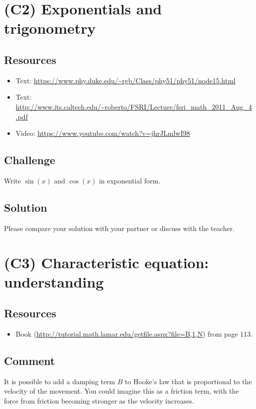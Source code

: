 



\newpage
\section{(C2) Exponentials and trigonometry}

\subsection*{Resources}
\begin{itemize}
    \item Text: \url{https://www.phy.duke.edu/~rgb/Class/phy51/phy51/node15.html}
    \item Text: \url{http://www.its.caltech.edu/~roberto/FSRI/Lecture/fsri_math_2011_Aug_4.pdf}
    \item Video: \url{https://www.youtube.com/watch?v=jhrJLmlwI98}
\end{itemize}

\subsection*{Challenge}
Write $\sin(x)$ and $\cos(x)$ in exponential form.

\subsection*{Solution}
Please compare your solution with your partner or discuss with the teacher.




\newpage
\section{(C3) Characteristic equation: understanding}

\subsection*{Resources}
\begin{itemize}
    \item Book (\url{http://tutorial.math.lamar.edu/getfile.aspx?file=B,1,N}) from page 113.
\end{itemize}

\subsection*{Comment}
It is possible to add a damping term $B$ to Hooke's law that is proportional to the velocity of the movement. You could imagine this as a friction term, with the force from friction becoming stronger as the velocity increases.

